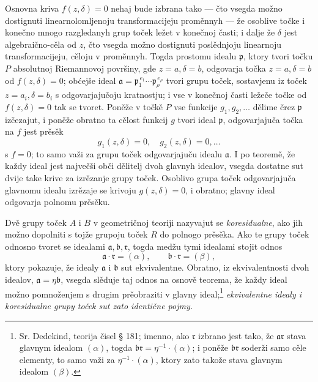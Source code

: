\documentclass[11pt]{article}
\providecommand{\fra}{\mathfrak a}
\providecommand{\frb}{\mathfrak b}
\providecommand{\frp}{\mathfrak p}
\providecommand{\frr}{\mathfrak r}
\begin{document}
Osnovna kriva \(f(z,\delta)=0\) nehaj bude izbrana tako --- čto vsegda možno dostignuti linearnolomljenoju transformacijeju proměnnyh --- že osoblive točke i konečno mnogo razgledanyh grup toček ležet v konečnoj časti; i dalje že \(\delta\) jest algebraično-cěla od \(z\), čto vsegda možno dostignuti poslědnjoju linearnoju transformacijeju, cěloju v proměnnyh. Togda prostomu idealu \(\frp\), ktory tvori točku \(P\) absolutnoj Riemannovoj površiny, gde \(z=a,\delta=b\), odgovarja točka \(z=a,\delta=b\) od \(f(z,\delta)=0\); obćejše ideal \(\fra=\frp_1^{\,e_1}\cdots\frp_\rho^{\,e_\rho}\) tvori grupu toček, sostavjenu iz toček \(z=a_i,\delta=b_i\) s odgovarjajučoju kratnostju; i vse v konečnoj časti ležeče točke od \(f(z,\delta)=0\) tak se tvoret. Poněže v točkě \(P\) vse funkcije \(g_1,g_2,\ldots\) dělime črez \(\frp\) izčezajut, i poněže obratno ta cělost funkcij \(g\) tvori ideal \(\frp\), odgovarjajuča točka na \(f\) jest prěsěk
\[
g_1(z,\delta)=0,\quad g_2(z,\delta)=0,\ldots
\]
s \(f=0\); to samo važi za grupu toček odgovarjajuču idealu \(\fra\). I po teoremě, že každy ideal jest največši obči dělitelj dvoh glavnyh idealov, vsegda dostatne sut dvije take krive za izrězanje grupy toček. Osoblivo grupa toček odgovarjajuča glavnomu idealu izrězaje se krivoju \(g(z,\delta)=0\), i obratno; glavny ideal odgovarja polnomu prěsěku.

Dvě grupy toček \(A\) i \(B\) v geometričnoj teoriji nazyvajut se {\itshape koresidualne}, ako jih možno dopolniti s tojže grupoju toček \(R\) do polnogo prěsěka. Ako te grupy toček odnosno tvoret se idealami \(\fra,\frb,\frr\), togda medžu tymi idealami stojit odnos
\[
\fra\cdot\frr=(\alpha),\qquad \frb\cdot\frr=(\beta),
\]
ktory pokazuje, že idealy \(\fra\) i \(\frb\) sut ekvivalentne. Obratno, iz ekvivalentnosti dvoh idealov, \(\fra=\eta\frb\), vsegda slěduje taj odnos na osnově teorema, že každy ideal možno pomnoženjem s drugim prěobraziti v glavny ideal;\footnote{Sr. Dedekind, teorija čisel § 181; imenno, ako \(\frr\) izbrano jest tako, že \(\fra\frr\) stava glavnym idealom \((\alpha)\), togda \(\frb\frr=\eta^{-1}\cdot(\alpha)\); i poněže \(\frb\frr\) soderži samo cěle elementy, to samo važi za \(\eta^{-1}\cdot(\alpha)\), ktory zato takože stava glavnym idealom \((\beta)\).} {\itshape ekvivalentne idealy i koresidualne grupy toček sut zato identične pojmy.}
\end{document}

